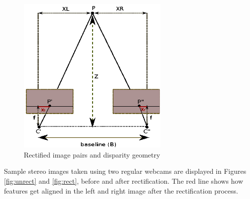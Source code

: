 \begin{figure}[H]
\centering
\includegraphics[width=0.65\textwidth, trim=20mm 0mm 0mm 150mm,clip]{rectdisp}
\caption{Rectified image pairs and disparity geometry}
\label{fig:rectify}
\end{figure} 

Sample stereo images taken using two regular webcams are displayed in Figures \ref{fig:unrect} and \ref{fig:rect},
before and after rectification. 
The red line shows how features get aligned in the left and right image after the rectification process.

